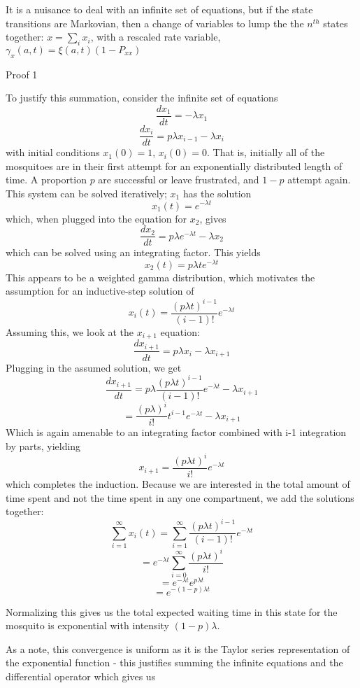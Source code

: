 \documentclass{article}
\begin{document}
It is a nuisance to deal with an infinite set of equations, but
if the state transitions are Markovian, then a change of
variables to lump the the $n^{th}$ states together: $x = \sum_i
x_i$, with a rescaled rate variable, $\gamma_x(a,t) =
\xi(a,t) (1-P_{xx})$   

\begin{bf}
Proof 1
\end{bf}

To justify this summation, consider the infinite set of equations
$$\frac{d x_1}{dt} = -\lambda x_1$$
$$\frac{d x_i}{dt} = p \lambda x_{i-1} - \lambda x_i$$
with initial conditions $x_1(0) = 1$, $x_i(0) = 0$. That is, initially
all of the mosquitoes are in their first attempt for an exponentially
distributed length of time. A proportion $p$ are successful or leave frustrated,
and $1-p$ attempt again. This system can be solved iteratively; $x_1$ has the solution
$$x_1(t) = e^{-\lambda t}$$ 
which, when plugged into the equation for $x_2$, gives
$$\frac{d x_2}{dt} = p \lambda e^{-\lambda t} - \lambda x_2$$ 
which can be solved using an integrating factor. This yields
$$x_2(t) = p \lambda t e^{-\lambda t}$$
This appears to be a weighted gamma distribution, which motivates the
assumption for an inductive-step solution of
$$x_i(t) = \frac{(p \lambda t)^{i-1}}{(i-1)!} e^{-\lambda t}$$
Assuming this, we look at the $x_{i+1}$ equation:
$$\frac{d x_{i+1}}{dt} = p\lambda x_i - \lambda x_{i+1}$$
Plugging in the assumed solution, we get
$$\frac{d x_{i+1}}{dt} = p\lambda \frac{(p \lambda t)^{i-1}}{(i-1)!} e^{-\lambda t} - \lambda x_{i+1}$$
$$= \frac{(p \lambda)^i}{i!}t^{i-1} e^{-\lambda t} - \lambda x_{i+1}$$
Which is again amenable to an integrating factor combined with i-1 integration by parts,
yielding
$$x_{i+1} = \frac{(p \lambda t)^{i}}{i!} e^{-\lambda t}$$
which completes the induction.
Because we are interested in the total amount of time spent and not the time
spent in any one compartment, we add the solutions together:
$$\sum_{i = 1}^{\infty} x_i(t) = \sum_{i = 1}^{\infty}\frac{(p \lambda t)^{i-1}}{(i-1)!} e^{-\lambda t}$$
$$ = e^{-\lambda t} \sum_{i=0}^{\infty}\frac{(p \lambda t)^i}{i!}$$
$$ = e^{-\lambda t} e^{p\lambda t}$$
$$ = e^{-(1-p) \lambda t}$$

Normalizing this gives us the total expected waiting time in this state for the
mosquito is exponential with intensity $(1-p) \lambda$.

As a note, this convergence is uniform as it is the Taylor series representation
of the exponential function - this justifies summing the infinite equations and
the differential operator which gives us
\end{document}

